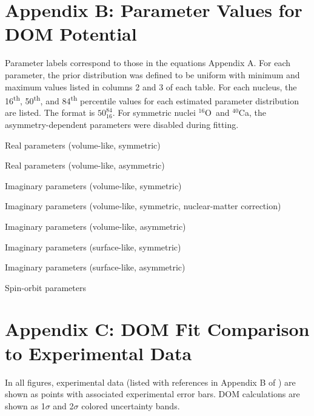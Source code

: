 \documentclass[twocolumn,secnumarabic,amssymb, nobibnotes, aps, prl,
superscriptaddress, nobalancelastpage]{revtex4}
\newcommand{\oSix}{\ensuremath{^{16}}O}
\newcommand{\caForty}{\ensuremath{^{40}}C\lowercase{a}}
\begin{document}
\clearpage
\onecolumngrid
\appendix \label{DOMParameterValues}
\section{Appendix B: Parameter Values for DOM Potential}
Parameter labels correspond to those in the equations Appendix A. 
For each parameter, the prior distribution was defined to be uniform with minimum and maximum values
listed in columns 2 and 3 of each table. For each nucleus, the
16\textsuperscript{th}, 50\textsuperscript{th}, and
84\textsuperscript{th} percentile values for each estimated parameter
distribution are listed. The format is $\text{50}^{\text{84}}_{\text{16}}$.
For symmetric nuclei \oSix\ and \caForty, the asymmetry-dependent parameters were disabled during fitting.
\begin{table}[htbp]
    \footnotesize
    \caption{Real parameters (volume-like, symmetric)}
    
    \caption{Real parameters (volume-like, asymmetric)}
    
    \caption{Imaginary parameters (volume-like, symmetric)}
    
    \caption{Imaginary parameters (volume-like, symmetric, nuclear-matter correction)}
    
    \caption{Imaginary parameters (volume-like, asymmetric)}
    
\end{table}
\clearpage
\begin{table}[htbp!]
    \footnotesize
    \caption{Imaginary parameters (surface-like, symmetric)}
    
    \vspace{0.3em}
    \caption{Imaginary parameters (surface-like, asymmetric)}
    
    \vspace{0.3em}
    \caption{Spin-orbit parameters}
    
\end{table}
\appendix \label{DOMFitResults}
\section{Appendix C: DOM Fit Comparison to Experimental Data}
In all figures, experimental data
(listed with references in Appendix B of \cite{PruittPhDThesis}) are shown
as points with associated experimental error bars. DOM calculations are shown as
1$\sigma$ and 2$\sigma$ colored uncertainty bands. 
\end{document}
